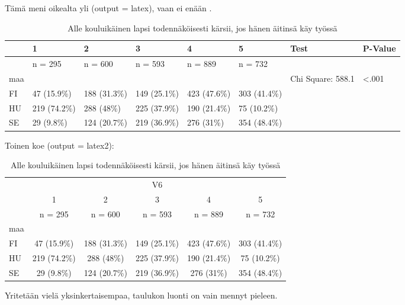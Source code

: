 \documentclass[12pt,a4paper,leqno]{article}
\theoremstyle{plain}
\theoremstyle{definition}
\theoremstyle{remark}
\begin{document}
Tämä meni oikealta yli (output = latex), vaan ei enään .

\begin{table}

\caption{\label{tab:}Alle kouluikäinen lapsi todennäköisesti kärsii, jos hänen äitinsä käy työssä }
\centering
\begin{tabular}[t]{llllllll}
\toprule
  & 1 & 2 & 3 & 4 & 5 & Test & P-Value\\
\midrule
 & n = 295 & n = 600 & n = 593 & n = 889 & n = 732 &  & \\
maa &  &  &  &  &  & Chi Square: 588.1 & <.001\\
FI & 47 (15.9\%) & 188 (31.3\%) & 149 (25.1\%) & 423 (47.6\%) & 303 (41.4\%) &  & \\
HU & 219 (74.2\%) & 288 (48\%) & 225 (37.9\%) & 190 (21.4\%) & 75 (10.2\%) &  & \\
SE & 29 (9.8\%) & 124 (20.7\%) & 219 (36.9\%) & 276 (31\%) & 354 (48.4\%) &  & \\
\bottomrule
\end{tabular}
\end{table}

Toinen koe (output = latex2):

\begin{table}[ ht ] 
\centering 
\caption{Alle kouluikäinen lapsi todennäköisesti kärsii, jos hänen äitinsä käy työssä }
\begin{tabular}{ l c c c c c }
\hline 
 & \multicolumn{ 5 }{c}{ V6 }\\ 
  & 1 & 2 & 3 & 4 & 5 \\ 
  & n = 295 & n = 600 & n = 593 & n = 889 & n = 732 \\ 
 \hline 
maa &   &   &   &   &  \\ 
\hspace{6pt}    FI & 47 (15.9\%) & 188 (31.3\%) & 149 (25.1\%) & 423 (47.6\%) & 303 (41.4\%)\\ 
\hspace{6pt}    HU & 219 (74.2\%) & 288 (48\%) & 225 (37.9\%) & 190 (21.4\%) & 75 (10.2\%)\\ 
\hspace{6pt}    SE & 29 (9.8\%) & 124 (20.7\%) & 219 (36.9\%) & 276 (31\%) & 354 (48.4\%)\\ 
 \hline
      \end{tabular}
      \end{table} 

Yritetään vielä yksinkertaisempaa, taulukon luonti on vain mennyt pieleen.
\end{document}
